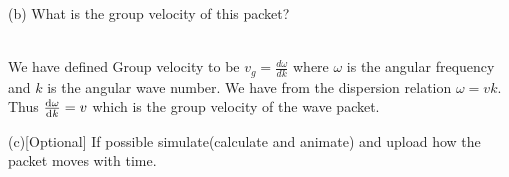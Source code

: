 \documentclass[addpoints]{exam}
\begin{document}
\begin{questions}
\begin{solution}
\end{solution}

(b) What is the group velocity of this packet?
\begin{solution}\\
    We have defined Group velocity to be $v_g = \frac{d\omega}{dk}$ where $\omega$ is the angular frequency and $k$ is the angular wave number. We have from the dispersion relation
    $\omega = vk$. Thus $\dv{\omega}{k} = v$ which is the group velocity of the wave packet.\\ 
    \begin{center}
    \end{center}
\end{solution}

(c)[Optional] If possible simulate(calculate and animate) and upload how the packet moves with 
time.
\begin{solution}\\
 
\end{solution}


\end{questions}
\end{document}
